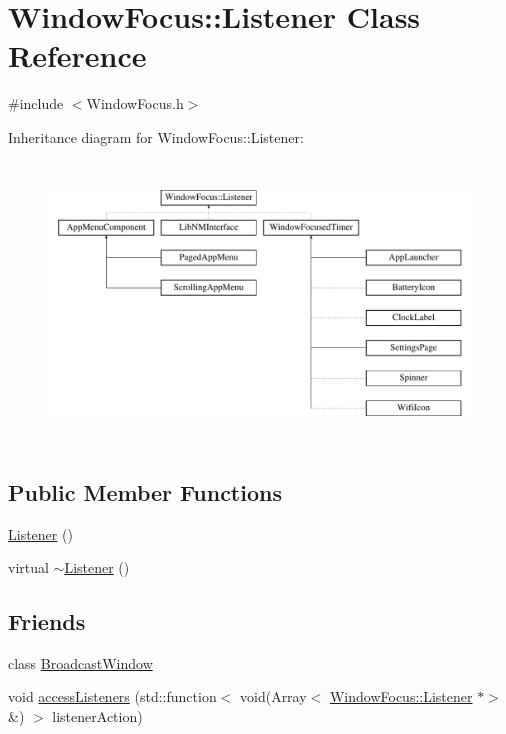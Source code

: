 \hypertarget{classWindowFocus_1_1Listener}{}\section{Window\+Focus\+:\+:Listener Class Reference}
\label{classWindowFocus_1_1Listener}


{\ttfamily \#include $<$Window\+Focus.\+h$>$}

Inheritance diagram for Window\+Focus\+:\+:Listener\+:\begin{figure}[H]
\begin{center}
\leavevmode
\includegraphics[height=7.466667cm]{classWindowFocus_1_1Listener}
\end{center}
\end{figure}
\subsection*{Public Member Functions}
\begin{DoxyCompactItemize}
\item 
\mbox{\hyperlink{classWindowFocus_1_1Listener_a22126cd810ce829a47247e67e52a7f72}{Listener}} ()
\item 
virtual \mbox{\hyperlink{classWindowFocus_1_1Listener_a772bf792832b79b53b4f76f62dbb7b26}{$\sim$\+Listener}} ()
\end{DoxyCompactItemize}
\subsection*{Friends}
\begin{DoxyCompactItemize}
\item 
class \mbox{\hyperlink{classWindowFocus_1_1Listener_a279028e0d9a84a0657de4a70a6232340}{Broadcast\+Window}}
\item 
void \mbox{\hyperlink{classWindowFocus_1_1Listener_aaed554ff2c658b98afa505c6a3cfd89f}{access\+Listeners}} (std\+::function$<$ void(Array$<$ \mbox{\hyperlink{classWindowFocus_1_1Listener}{Window\+Focus\+::\+Listener}} $\ast$$>$ \&) $>$ listener\+Action)
\end{DoxyCompactItemize}


